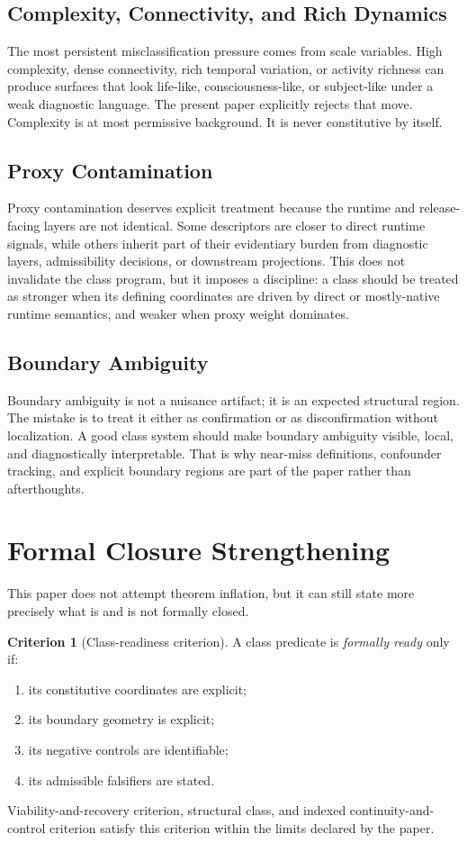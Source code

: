 \documentclass[11pt,a4paper]{article}
\theoremstyle{definition}
\newtheorem{criterion}[proposition]{Criterion}
\begin{document}
\subsection{Complexity, Connectivity, and Rich Dynamics}
The most persistent misclassification pressure comes from scale variables. High complexity, dense connectivity, rich temporal variation, or activity richness can produce surfaces that look life-like, consciousness-like, or subject-like under a weak diagnostic language. The present paper explicitly rejects that move. Complexity is at most permissive background. It is never constitutive by itself.

\subsection{Proxy Contamination}
Proxy contamination deserves explicit treatment because the runtime and release-facing layers are not identical. Some descriptors are closer to direct runtime signals, while others inherit part of their evidentiary burden from diagnostic layers, admissibility decisions, or downstream projections. This does not invalidate the class program, but it imposes a discipline: a class should be treated as stronger when its defining coordinates are driven by direct or mostly-native runtime semantics, and weaker when proxy weight dominates.

\subsection{Boundary Ambiguity}
Boundary ambiguity is not a nuisance artifact; it is an expected structural region. The mistake is to treat it either as confirmation or as disconfirmation without localization. A good class system should make boundary ambiguity visible, local, and diagnostically interpretable. That is why near-miss definitions, confounder tracking, and explicit boundary regions are part of the paper rather than afterthoughts.

\section{Formal Closure Strengthening}
This paper does not attempt theorem inflation, but it can still state more precisely what is and is not formally closed.

\begin{criterion}[Class-readiness criterion]
A class predicate is \emph{formally ready} only if:
\begin{enumerate}[leftmargin=1.5em]
\item its constitutive coordinates are explicit;
\item its boundary geometry is explicit;
\item its negative controls are identifiable;
\item its admissible falsifiers are stated.
\end{enumerate}
Viability-and-recovery criterion, structural class, and indexed continuity-and-control criterion satisfy this criterion within the limits declared by the paper.
\end{criterion}
\end{document}
